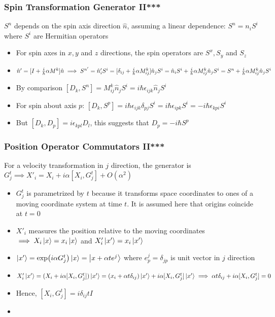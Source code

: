 \documentclass[8pt,t,mathserif,aspectratio=169]{beamer}
\begin{document}
\begin{frame}
  \frametitle{Spin Transformation Generator II***}
  \vspace{1mm}
  $S^n$ depends on the spin axis direction $\hat{n}$, assuming a linear dependence: $S^n = n_i S^i$ where $S^i$ are Hermitian operators
  \begin{itemize}
    \item For spin axes in $x,y$ and $z$ directions, the spin operators are $S^x,S_y$ and $S_z$
    \item $\hat{n}' = [I + {i \over \hbar} \alpha M^k] \hat{n} \implies S^{n'} = \hat{n}_i' S^i = [\delta_{ij} + {i \over \hbar} \alpha M^k_{ij}] \hat{n}_j S^i = \hat{n}_i S^i + {i \over \hbar} \alpha M^k_{ij} \hat{n}_j S^i = S^n + {i \over \hbar} \alpha M^k_{ij} \hat{n}_j S^i$
    \item By comparison $[D_k,S^n] = M^k_{ij} \hat{n}_j S^i = i \hbar \epsilon_{ijk} \hat{n}_j S^i$
    \item For spin about axis $p$: $[D_k,S^p] = i \hbar \epsilon_{ijk} \delta_{pj} S^i = i \hbar \epsilon_{ipk} S^i = -i \hbar \epsilon_{kpi} S^i$
    \item But $[D_k,D_p] = i \epsilon_{kpl} D_l$, this suggests that $D_p = -i \hbar S^p$
  \end{itemize}
\end{frame}

\begin{frame}
  \frametitle{Position Operator Commutators II***}
  \vspace{1mm}
  For a velocity transformation in $j$ direction, the generator is $G^t_j \implies X'_i = X_i + i \alpha [X_i,G^t_j] + O(\alpha^2)$
  \begin{itemize}
    \item $G^t_j$ is parametrized by $t$ because it transforms space coordinates to ones of a moving coordinate system at time $t$. It is assumed here that origins coincide at $t = 0$
    \item $X'_i$ measures the position relative to the moving coordinates $\implies X_i \ket{x} = x_i \ket{x}$ and $X'_i \ket{x'} = x_i \ket{x'}$
    \item $\ket{x'} = \exp(i \alpha G^t_j) \ket{x} = \ket{x + \alpha t e^j}$ where $e^j_p = \delta_{jp}$ is unit vector in $j$ direction
    \item $X'_i \ket{x'} = (X_i + i \alpha [X_i,G^t_j])\ket{x'} = (x_i + \alpha t \delta_{ij})\ket{x'} + i \alpha [X_i,G^t_j] \ket{x'} \implies \alpha t \delta_{ij} + i \alpha [X_i,G^t_j] = 0$
    \item Hence, $[X_i,G^t_j] = i \delta_{ij} t I$
    \item $$
  \end{itemize}
\end{frame}
\end{document}

